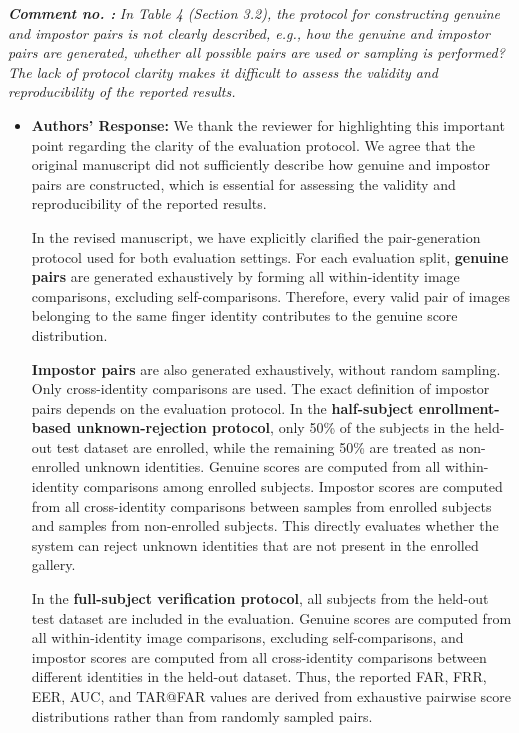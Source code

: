 \documentclass[11pt]{article}
\theoremstyle{remark}
\newcounter{mycounter} %
\newcommand\showReviewcounter{\stepcounter{mycounter}\themycounter}
\begin{document}
\color{blue} 
\textbf{\textit{Comment no. \showReviewcounter:}} 
\textit{In Table 4 (Section 3.2), the protocol for constructing genuine and impostor pairs is not clearly described, e.g., how the genuine and impostor pairs are generated, whether all possible pairs are used or sampling is performed? The lack of protocol clarity makes it difficult to assess the validity and reproducibility of the reported results.}
\color{black}

\begin{itemize}
	\item \textbf{Authors' Response:} 
	We thank the reviewer for highlighting this important point regarding the clarity of the evaluation protocol. We agree that the original manuscript did not sufficiently describe how genuine and impostor pairs are constructed, which is essential for assessing the validity and reproducibility of the reported results.

	In the revised manuscript, we have explicitly clarified the pair-generation protocol used for both evaluation settings. For each evaluation split, \textbf{genuine pairs} are generated exhaustively by forming all within-identity image comparisons, excluding self-comparisons. Therefore, every valid pair of images belonging to the same finger identity contributes to the genuine score distribution.

	\textbf{Impostor pairs} are also generated exhaustively, without random sampling. Only cross-identity comparisons are used. The exact definition of impostor pairs depends on the evaluation protocol. In the \textbf{half-subject enrollment-based unknown-rejection protocol}, only 50\% of the subjects in the held-out test dataset are enrolled, while the remaining 50\% are treated as non-enrolled unknown identities. Genuine scores are computed from all within-identity comparisons among enrolled subjects. Impostor scores are computed from all cross-identity comparisons between samples from enrolled subjects and samples from non-enrolled subjects. This directly evaluates whether the system can reject unknown identities that are not present in the enrolled gallery.

	In the \textbf{full-subject verification protocol}, all subjects from the held-out test dataset are included in the evaluation. Genuine scores are computed from all within-identity image comparisons, excluding self-comparisons, and impostor scores are computed from all cross-identity comparisons between different identities in the held-out dataset. Thus, the reported FAR, FRR, EER, AUC, and TAR@FAR values are derived from exhaustive pairwise score distributions rather than from randomly sampled pairs.


\end{itemize}
\end{document}
